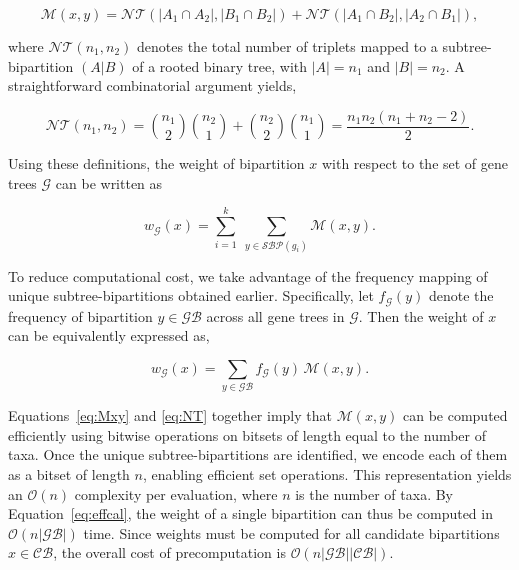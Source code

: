 \documentclass[runningheads]{llncs}
\begin{document}
\begin{equation}
\mathcal{M}(x,y) = \mathcal{NT}(|A_{1} \cap A_{2}|, |B_{1} \cap B_{2}|) 
+ \mathcal{NT}(|A_{1} \cap B_{2}|, |A_{2} \cap B_{1}|),
\label{eq:Mxy}
\end{equation}

where $\mathcal{NT}(n_1,n_2)$ denotes the total number of triplets mapped to a subtree-bipartition $(A|B)$ of a rooted binary tree, with $|A| = n_1$ and $|B| = n_2$. A straightforward combinatorial argument yields,

\begin{equation}
\mathcal{NT}(n_1, n_2) = \binom{n_1}{2}\binom{n_2}{1} + \binom{n_2}{2}\binom{n_1}{1} 
= \frac{n_1 n_2 (n_1 + n_2 - 2)}{2}.
\label{eq:NT}
\end{equation}

Using these definitions, the weight of bipartition $x$ with respect to the set of gene trees $\mathcal{G}$ can be written as

\begin{equation}
w_{\mathcal{G}}(x) = \sum_{i=1}^{k} \; \sum_{y \in \mathcal{SBP}(g_i)} \mathcal{M}(x,y).
\end{equation}

To reduce computational cost, we take advantage of the frequency mapping of unique subtree-bipartitions obtained earlier. Specifically, let $f_{\mathcal{G}}(y)$ denote the frequency of bipartition $y \in \mathcal{GB}$ across all gene trees in $\mathcal{G}$. Then the weight of $x$ can be equivalently expressed as,

\begin{equation}
w_{\mathcal{G}}(x) = \sum_{y \in \mathcal{GB}} f_{\mathcal{G}}(y)\,\mathcal{M}(x,y).
\label{eq:effcal}
\end{equation}

Equations~\eqref{eq:Mxy} and \eqref{eq:NT} together imply that $\mathcal{M}(x,y)$ can be computed efficiently using bitwise operations on bitsets of length equal to the number of taxa. Once the unique subtree-bipartitions are identified, we encode each of them as a bitset of length $n$, enabling efficient set operations. This representation yields an $\mathcal{O}(n)$ complexity per evaluation, where $n$ is the number of taxa. By Equation~\ref{eq:effcal}, the weight of a single bipartition can thus be computed in $\mathcal{O}(n|\mathcal{GB}|)$ time. Since weights must be computed for all candidate bipartitions $x \in \mathcal{CB}$, the overall cost of precomputation is $\mathcal{O}(n|\mathcal{GB}||\mathcal{CB}|)$.
\end{document}
